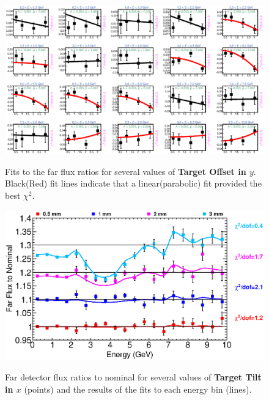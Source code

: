 {\begin{figure}[ht]
  \begin{center}
    {\includegraphics[width=5.0in]{figures/TargetYOffset_far_fits.eps}}
  \end{center}
\caption{ Fits to the far flux ratios for several values of {\bf Target Offset in $y$}. Black(Red) fit lines indicate that a linear(parabolic) fit provided the best $\chi^2$. }
\end{figure}

\begin{figure}[ht]
  \begin{center}
    {\includegraphics[width=6.0in]{figures/TargetXTilt_far_summary.eps}}
  \end{center}
\caption{ Far detector flux ratios to nominal for several values of {\bf Target Tilt in $x$} (points) and the results of the fits to each energy bin (lines).}
\end{figure}

}
